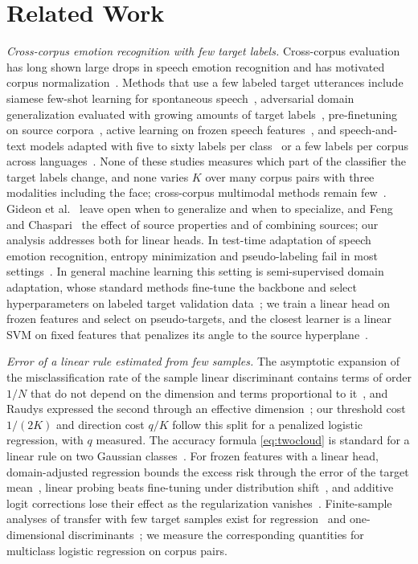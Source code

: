 \section{Related Work}
\label{sec:related}

\emph{Cross-corpus emotion recognition with few target labels.}
Cross-corpus evaluation has long shown large drops in speech emotion recognition and has motivated corpus normalization~\cite{schuller2010crosscorpus}.
Methods that use a few labeled target utterances include siamese few-shot learning for spontaneous speech~\cite{feng2023fewshot}, adversarial domain generalization evaluated with growing amounts of target labels~\cite{gideon2021addog}, pre-finetuning on source corpora~\cite{chen2023prefinetuning}, active learning on frozen speech features~\cite{xu2024crosstask}, and speech-and-text models adapted with five to sixty labels per class~\cite{he2025m4ser} or a few labels per corpus across languages~\cite{zaidi2024enhancing}.
None of these studies measures which part of the classifier the target labels change, and none varies $K$ over many corpus pairs with three modalities including the face; cross-corpus multimodal methods remain few~\cite{ahn2025multitask}.
Gideon et al.~\cite{gideon2021addog} leave open when to generalize and when to specialize, and Feng and Chaspari~\cite{feng2023fewshot} the effect of source properties and of combining sources; our analysis addresses both for linear heads.
In test-time adaptation of speech emotion recognition, entropy minimization and pseudo-labeling fail in most settings~\cite{dong2026test}.
In general machine learning this setting is semi-supervised domain adaptation, whose standard methods fine-tune the backbone and select hyperparameters on labeled target validation data~\cite{saito2019mme,yang2021decota}; we train a linear head on frozen features and select on pseudo-targets, and the closest learner is a linear SVM on fixed features that penalizes its angle to the source hyperplane~\cite{donahue2013semisupervised}.

\emph{Error of a linear rule estimated from few samples.}
The asymptotic expansion of the misclassification rate of the sample linear discriminant contains terms of order $1/N$ that do not depend on the dimension and terms proportional to it~\cite{okamoto1963asymptotic}, and Raudys expressed the second through an effective dimension~\cite{raudys1998intrinsic}; our threshold cost $1/(2K)$ and direction cost $q/K$ follow this split for a penalized logistic regression, with $q$ measured.
The accuracy formula \eqref{eq:twocloud} is standard for a linear rule on two Gaussian classes~\cite{desilva2023value,dobriban2018highdimensional}.
For frozen features with a linear head, domain-adjusted regression bounds the excess risk through the error of the target mean~\cite{rosenfeld2022domainadjusted}, linear probing beats fine-tuning under distribution shift~\cite{kumar2022lpft}, and additive logit corrections lose their effect as the regularization vanishes~\cite{kini2021labelimbalanced}.
Finite-sample analyses of transfer with few target samples exist for regression~\cite{ha2026labeled} and one-dimensional discriminants~\cite{desilva2023value}; we measure the corresponding quantities for multiclass logistic regression on corpus pairs.

